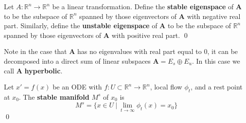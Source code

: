 
\begin{definition}
	Let $A: \mathbb{R}^n \to \mathbb{R}^n$ be a linear transformation. Define the \textbf{stable eigenspace} of $\mathbf{A}$ to be the subspace of $\mathbb{R}^n$ spanned by those eigenvectors of $\mathbf{A}$ with negative real part. Similarly, define the \textbf{unstable eigenspace} of $\mathbf{A}$ to be the subspace of $\mathbb{R}^n$ spanned by those eigenvectors of $\mathbf{A}$ with positive real part. %
	\qed
\end{definition}

Note in the case that $\mathbf{A}$ has no eigenvalues with real part equal to 0, it can be decomposed into a direct sum of linear subspaces $\mathbf{A} = E_s \oplus E_u$. In this case we call $\mathbf{A}$ \textbf{hyperbolic}.

\begin{definition}
	Let $x' = f(x)$ be an ODE with $f:U \subset \mathbb{R}^n \to \mathbb{R}^n$, local flow $\phi_t$, and a rest point at $x_0$. The \textbf{stable manifold} $M^s$ %
	of $x_0$ is %
	$$M^s = \{x \in U ~|~ \lim\limits_{t \to \infty} \phi_t(x)= x_0\}$$ 
	\qed
\end{definition}


